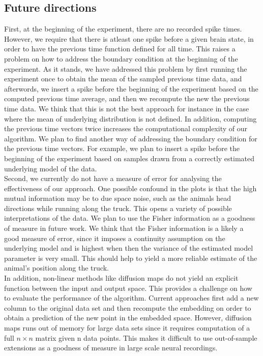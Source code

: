 \subsection{Future directions}
First, at the beginning of the experiment, there are no recorded spike times.
However, we require that there is atleast one spike before a given brain state,
in order to have the previous time function defined for all time.
This raises a problem on how to address the boundary condition at the beginning
of the experiment. As it stands, we have addressed this problem by first running the experiment once to obtain the mean of the sampled previous time data, and afterwords, we insert a spike before the beginning of the experiment based on the computed previous time average, and then we recompute the new the previous time data. We think that this is not the best approach for instance in the case where the mean of underlying distribution is not defined. In addition, computing the previous time vectors twice increases the computational complexity of our algorithm. We plan to find another way of addressing the boundary condition
for the previous time vectors. For example, we plan to insert a spike before the beginning of the experiment based on samples drawn from a correctly estimated underlying model of the data.\\

Second, we currently do not have a measure of error for analysing the  effectiveness of our approach. One possible confound in the plots is that the high  mutual information may be to due space noise, such as the animals head directions while running along the truck. This opens a variety of possible interpretations of the data. We plan to use the Fisher information as a goodness of measure in future work. We think that the Fisher information is a likely a good measure of error, since it imposes a continuity assumption on the underlying model and is highest when then the variance of the estimated model parameter is very small.
This should help to yield a more reliable estimate of the animal's position along the truck. \\

In addition, non-linear methods like diffusion maps do not yield an explicit function between the input and output space. This provides a challenge on how to evaluate the performance of the algorithm. Current approaches first add a new column to the original data set and then recompute the embedding on order to obtain a prediction of the new point in the embedded space. However, diffusion maps runs out of memory for large data sets since it requires computation of a full $n \times n$ matrix given n data points. This makes it difficult to use out-of-sample extensions as a goodness of measure in large scale neural recordings.\\

